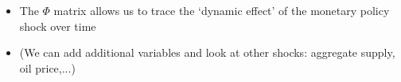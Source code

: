 \begin{frame}
\begin{itemize}
\begin{itemize}
\item The $\Phi $ matrix allows us to trace the `dynamic effect' of the
monetary policy shock over time\medskip 
{}
\pause

\item (We can add additional variables and look at other shocks: aggregate
supply, oil price,...)
\end{itemize}
\end{itemize}
\end{frame}


